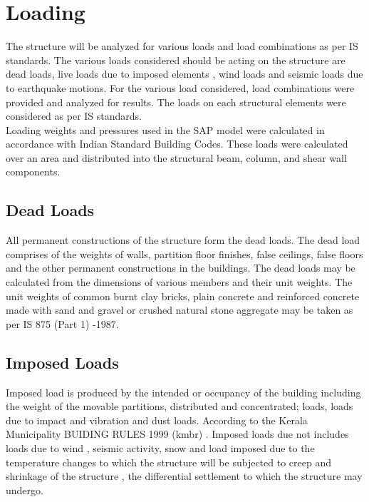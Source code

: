 \section{Loading}
The structure will be analyzed for various loads and load combinations as per IS standards. The various loads considered should be acting on the structure are dead loads, live loads due to imposed elements , wind loads and seismic loads due to earthquake motions. For the various load considered, load combinations were provided and analyzed for results. The loads on each structural elements were considered as per IS standards.\\
Loading weights and pressures used in the SAP model were calculated in accordance 
with Indian Standard Building Codes. These loads were calculated over an area and 
distributed into the structural beam, column, and shear wall components. \\
\subsection{Dead Loads}
All permanent constructions of the structure form the dead loads. The dead load comprises of the weights of walls, partition floor finishes, false ceilings, false floors and the other permanent constructions in the buildings. The dead loads may be calculated from the dimensions of various members and their unit weights. The unit weights of common burnt clay bricks, plain concrete and reinforced concrete made with sand and gravel or crushed natural stone aggregate may be taken as per IS 875 (Part 1) -1987.
\subsection{Imposed Loads}
Imposed load is produced by the intended or occupancy of the building including the weight of the movable partitions, distributed and concentrated; loads, loads due to impact and vibration and dust loads. According to the Kerala Municipality BUIDING RULES 1999 (kmbr) . Imposed loads due not includes loads due to wind , seismic activity, snow and load imposed due to the temperature changes to which the structure will be subjected to creep and shrinkage of the structure , the differential settlement to which the structure may undergo.
